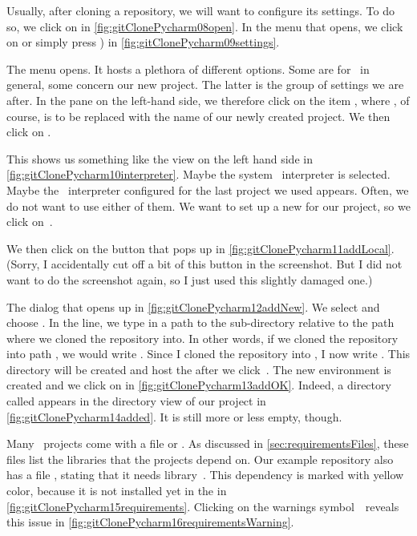 Usually, after cloning a repository, we will want to configure its  settings.
To do so, we click on \keys{\pycharmMainMenu} in \cref{fig:gitClonePycharm08open}.
In the menu that opens, we click on  or simply press ) in \cref{fig:gitClonePycharm09settings}.

The  menu opens.
It hosts a plethora of different options.
Some are for \pycharm\ in general, some concern our new project.
The latter is the group of settings we are after.
In the pane on the left-hand side, we therefore click on the item , where , of course, is to be replaced with the name of our newly created project.
We then click on .

This shows us something like the view on the left hand side in \cref{fig:gitClonePycharm10interpreter}.
Maybe the system \python\ interpreter is selected.
Maybe the \python\ interpreter configured for the last project we used appears.
Often, we do not want to use either of them.
We want to set up a new  for our project, so we click on~.

We then click on the button  that pops up in \cref{fig:gitClonePycharm11addLocal}.
(Sorry, I accidentally cut off a bit of this button in the screenshot.
But I did not want to do the screenshot again, so I just used this slightly damaged one.)

The  dialog that opens up in \cref{fig:gitClonePycharm12addNew}.
We select  and choose .
In the  line, we type in a path to the sub-directory  relative to the path where we cloned the repository into.
In other words, if we cloned the repository into path , we would write .
Since I cloned the repository into , I now write .
This directory  will be created and host the  after we click~.
The new environment is created and we click on  in \cref{fig:gitClonePycharm13addOK}.
Indeed, a directory called  appears in the directory view of our project in \cref{fig:gitClonePycharm14added}.
It is still more or less empty, though.

Many \python\ projects come with a file  or .
As discussed in \cref{sec:requirementsFiles}, these files list the libraries that the projects depend on.
Our example repository also has a file , stating that it needs library~\psycopg.
This dependency is marked with yellow color, because it is not installed yet in the  in \cref{fig:gitClonePycharm15requirements}.
Clicking on the warnings symbol~\pycharmWarningsSymbol\ reveals this issue in \cref{fig:gitClonePycharm16requirementsWarning}.

